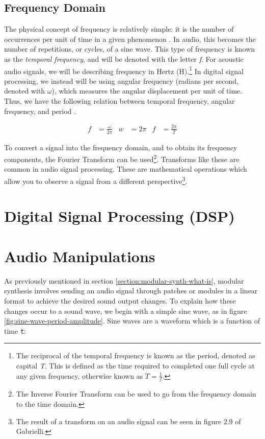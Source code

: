 \subsection{Frequency Domain}
The physical concept of frequency is relatively simple: it is the number of occurrences per unit of time in a given phenomenon \cite{Gabrielli_2020}. In audio, this becomes the number of repetitions, or cycles, of a sine wave. This type of frequency is known as the \textit{temporal frequency}, and will be denoted with the letter \textit{f}. For acoustic audio signals, we will be describing frequency in Hertz (H).\footnote{The reciprocal of the temporal frequency is known as the period, denoted as capital \textit{T}. This is defined as the time required to completed one full cycle at any given frequency, otherwise known as $T = \frac{1}{\textit{f}}$.} In digital signal processing, we instead will be using angular frequency (radians per second, denoted with $\omega$), which measures the angular displacement per unit of time. Thus, we have the following relation between temporal frequency, angular frequency, and period \cite{Gabrielli_2020}.

\begin{align}
    f &= \frac{\omega}{2\pi} &w &= 2\pi &f &= \frac{2\pi}{T}
\end{align}

To convert a signal into the frequency domain, and to obtain its frequency components, the Fourier Transform can be used\footnote{The Inverse Fourier Transform can be used to go from the frequency domain to the time domain.}. Transforms like these are common in audio signal processing. These are mathematical operations which allow you to observe a signal from a different perspective\footnote{The result of a transform on an audio signal can be seen in figure 2.9 of Gabrielli.}.

\section{Digital Signal Processing (DSP)}

\section{Audio Manipulations}
As previously mentioned in section \ref{section:modular-synth-what-is}, modular synthesis involves sending an audio signal through patches or modules in a linear format to achieve the desired sound output changes. To explain how these changes occur to a sound wave, we begin with a simple sine wave, as in figure \ref{fig:sine-wave-period-amplitude}. Sine waves are a waveform which is a function of time \texttt{t}:

